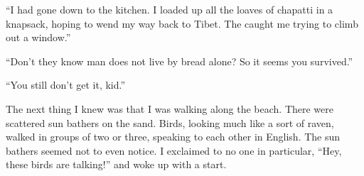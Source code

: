 ``I had gone down to the kitchen. I loaded up all the loaves of chapatti in a knapsack, hoping to wend my way back to Tibet. The caught me trying to climb out a window.''

``Don't they know man does not live by bread alone? So it seems you survived.''

``You still don't get it, kid.''

The next thing I knew was that I was walking along the beach. There were scattered sun bathers on the sand. Birds, looking much like a sort of raven, walked in groups of two or three, speaking to each other in English. The sun bathers seemed not to even notice. I exclaimed to no one in particular, ``Hey, these birds are talking!'' and woke up with a start.




